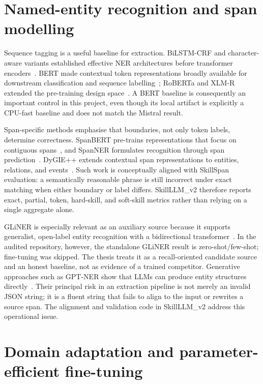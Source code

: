 \section{Named-entity recognition and span modelling}

Sequence tagging is a useful baseline for extraction. BiLSTM-CRF and character-aware variants established effective NER architectures before transformer encoders~\cite{huang2015bilstmcrf,lample2016ner,ma2016bilstmcnncrf}. BERT made contextual token representations broadly available for downstream classification and sequence labelling~\cite{devlin2019bert}; RoBERTa and XLM-R extended the pre-training design space~\cite{liu2019roberta,conneau2020xlmr}. A BERT baseline is consequently an important control in this project, even though its local artifact is explicitly a CPU-fast baseline and does not match the Mistral result.

Span-specific methods emphasise that boundaries, not only token labels, determine correctness. SpanBERT pre-trains representations that focus on contiguous spans~\cite{joshi2020spanbert}, and SpanNER formulates recognition through span prediction~\cite{fu2021spanner}. DyGIE++ extends contextual span representations to entities, relations, and events~\cite{wadden2019dygiepp}. Such work is conceptually aligned with SkillSpan evaluation: a semantically reasonable phrase is still incorrect under exact matching when either boundary or label differs. SkillLLM\_v2 therefore reports exact, partial, token, hard-skill, and soft-skill metrics rather than relying on a single aggregate alone.

GLiNER is especially relevant as an auxiliary source because it supports generalist, open-label entity recognition with a bidirectional transformer~\cite{zaratiana2023gliner}. In the audited repository, however, the standalone GLiNER result is zero-shot/few-shot; fine-tuning was skipped. The thesis treats it as a recall-oriented candidate source and an honest baseline, not as evidence of a trained competitor. Generative approaches such as GPT-NER show that LLMs can produce entity structures directly~\cite{wang2023gptner}. Their principal risk in an extraction pipeline is not merely an invalid JSON string; it is a fluent string that fails to align to the input or rewrites a source span. The alignment and validation code in SkillLLM\_v2 address this operational issue.

\section{Domain adaptation and parameter-efficient fine-tuning}

